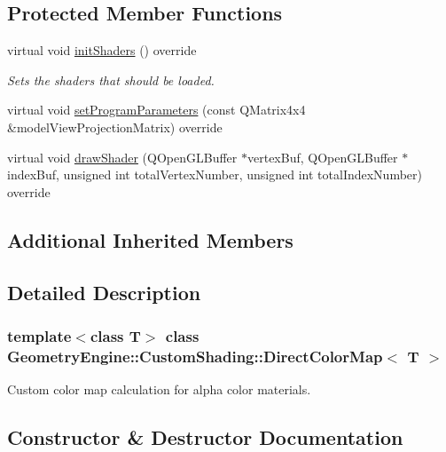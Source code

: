 \subsection*{Protected Member Functions}
\begin{DoxyCompactItemize}
\item 
\mbox{\label{class_geometry_engine_1_1_custom_shading_1_1_direct_color_map_a41f078bd1afc66b628e6208f116c8dc4}} 
virtual void \mbox{\hyperlink{class_geometry_engine_1_1_custom_shading_1_1_direct_color_map_a41f078bd1afc66b628e6208f116c8dc4}{init\+Shaders}} () override
\begin{DoxyCompactList}\small\item\em Sets the shaders that should be loaded. \end{DoxyCompactList}\item 
virtual void \mbox{\hyperlink{class_geometry_engine_1_1_custom_shading_1_1_direct_color_map_a1225b6be095646d969d8bde5f8eaac73}{set\+Program\+Parameters}} (const Q\+Matrix4x4 \&model\+View\+Projection\+Matrix) override
\item 
virtual void \mbox{\hyperlink{class_geometry_engine_1_1_custom_shading_1_1_direct_color_map_a22949fb9c7ae04a6bacc001034c41a04}{draw\+Shader}} (Q\+Open\+G\+L\+Buffer $\ast$vertex\+Buf, Q\+Open\+G\+L\+Buffer $\ast$index\+Buf, unsigned int total\+Vertex\+Number, unsigned int total\+Index\+Number) override
\end{DoxyCompactItemize}
\subsection*{Additional Inherited Members}


\subsection{Detailed Description}
\subsubsection*{template$<$class T$>$\newline
class Geometry\+Engine\+::\+Custom\+Shading\+::\+Direct\+Color\+Map$<$ T $>$}

Custom color map calculation for alpha color materials. 

\subsection{Constructor \& Destructor Documentation}
\mbox{\label{class_geometry_engine_1_1_custom_shading_1_1_direct_color_map_ac5a0725e933fe4d5b75a46b7fa83e0dc}} 
